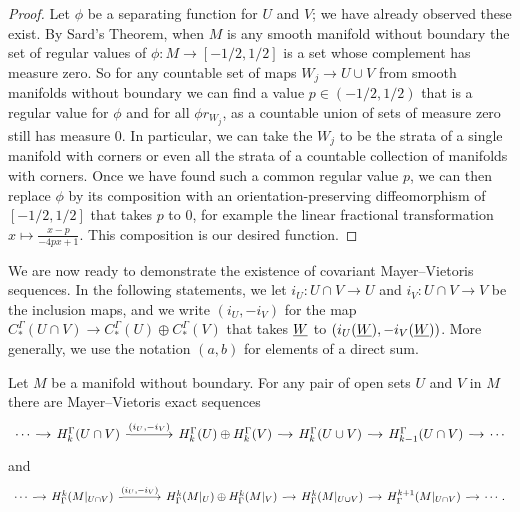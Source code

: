 \begin{proof}
	Let $\phi$ be a separating function for $U$ and $V$; we have already observed these exist.
	By Sard's Theorem, when $M$ is any smooth manifold without boundary the set of regular values of $\phi \colon M \to [-1/2,1/2]$ is a set whose complement has measure zero.
	So for any countable set of maps $W_j \to U \cup V$ from smooth manifolds without boundary we can find a value $p \in (-1/2, 1/2)$ that is a regular value for $\phi$ and for all $\phi r_{W_j}$, as a countable union of sets of measure zero still has measure $0$.
	In particular, we can take the $W_j$ to be the strata of a single manifold with corners or even all the strata of a countable collection of manifolds with corners.
 Once we have found such a common regular value $p$, we can then replace $\phi$ by its composition with an orientation-preserving diffeomorphism of $[-1/2,1/2]$ that takes $p$ to $0$, for example the linear fractional transformation $x \mapsto \frac{x-p}{-4px+1}$.
	This composition is our desired function.
\end{proof}


We are now ready to demonstrate the existence of covariant Mayer--Vietoris sequences.
In the following statements, we let $i_U \colon U \cap V \to U$ and $i_V \colon U \cap V \to V$ be the inclusion maps, and we write $(i_U, -i_V)$ for the map $C_*^{\Gamma}(U \cap V) \to C_*^{\Gamma}(U) \oplus C_*^{\Gamma}(V)$ that takes $\underline{W}$ to $(i_U(\underline{W}), -i_V(\underline{W}))$.
More generally, we use the notation $(a,b)$ for elements of a direct sum.


\begin{theorem}\label{T: relative MV}
	Let $M$ be a manifold without boundary.
	For any pair of open sets $U$ and $V$ in $M$ there are Mayer--Vietoris exact sequences
	\begin{equation*}
		\begin{tikzcd}[
			column sep = small,
			arrow style = math font,
			cells = {nodes = {text height = 2ex,text depth = 0.75ex}}
			]
			\cdots \arrow[r] & H^{\Gamma}_{k}(U \cap V) \arrow[r, "(i_U{,} -i_V)"] & [25pt] H^{\Gamma}_k(U) \oplus H^{\Gamma}_{k}(V)
			\arrow[r] & H_{k}^{\Gamma}(U \cup V) \arrow[r] & H_{k-1}^{\Gamma}(U \cap V) \arrow[r] & \cdots
		\end{tikzcd}
	\end{equation*}
	and
	\begin{equation*}
		\begin{tikzcd}[
			column sep = small,
			arrow style = math font,
			cells = {nodes = {text height = 2ex,text depth = 0.75ex}}
			]
			\cdots \arrow[r] & H_{\Gamma}^{k}(M|_{U \cap V}) \arrow[r, "(i_U{,} -i_V)"] & [25pt] H_{\Gamma}^k(M|_U) \oplus H_{\Gamma}^{k}(M|_V)
			\arrow[r] & H^{k}_{\Gamma}(M|_{U \cup V}) \arrow[r] & H^{k+1}_{\Gamma}(M|_{U \cap V}) \arrow[r] & \cdots.
		\end{tikzcd}
	\end{equation*}
\end{theorem}

